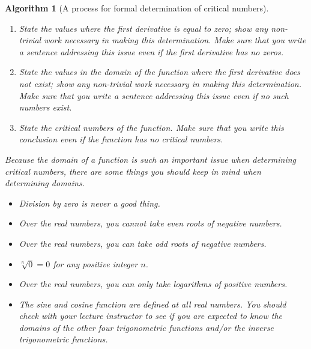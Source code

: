 \documentclass[10pt,oneside,]{book}
\theoremstyle{plain}
\newtheorem{algorithm}[theorem]{Algorithm}
\theoremstyle{definition}
\numberwithin{equation}{section}
\begin{document}
\begin{algorithm}[A process for formal determination of critical numbers]
\begin{enumerate}
                \item{}State the values where the first derivative is equal to zero; show any non-trivial work necessary in making this determination.  Make sure that you write a sentence addressing this issue even if the first derivative has no zeros.\item{}State the values \emph{in the domain of the function} where the first derivative does not exist; show any non-trivial work necessary in making this determination.    Make sure that you write a sentence addressing this issue even if no such numbers exist.\item{}State the critical numbers of the function.  Make sure that you write this conclusion even if the function has no critical numbers.\end{enumerate}
\par
Because the domain of a function is such an important issue when determining critical numbers, there are some things you should keep in mind when determining domains.%
\begin{multicols}{2}
\begin{itemize}[label=\textbullet]
\item{}Division by zero is never a good thing.\item{}Over the real numbers, you \emph{cannot} take \emph{even} roots of negative numbers.\item{}Over the real numbers, you \emph{can} take \emph{odd} roots of negative numbers.\item{}\(\sqrt[n]{0}=0\) for any positive integer \(n\).\item{}Over the real numbers, you can only take logarithms of positive numbers.\item{}The sine and cosine function are defined at all real numbers.  You should check with your lecture instructor to see if you are expected to know the domains of the other four trigonometric functions and/or the inverse trigonometric functions.\end{itemize}
\end{multicols}
\end{algorithm}
\typeout{************************************************}
\typeout{************************************************}
\end{document}
